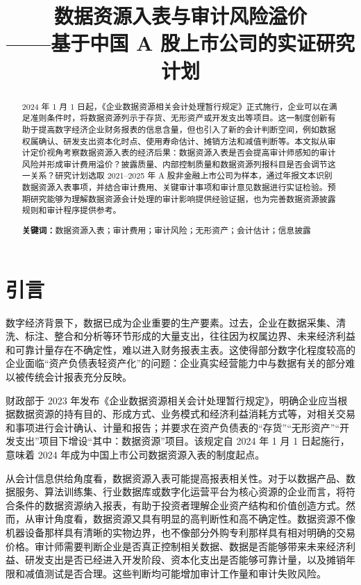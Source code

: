 \documentclass[UTF8,zihao=-4,a4paper]{ctexart}
\title{\bfseries 数据资源入表与审计风险溢价\\
{\large ——基于中国 A 股上市公司的实证研究计划}}
\author{}
\date{}
\begin{document}
\maketitle
\vspace{-2.2em}

\begin{abstract}
2024 年 1 月 1 日起，《企业数据资源相关会计处理暂行规定》正式施行，企业可以在满足准则条件时，将数据资源列示于存货、无形资产或开发支出等项目。这一制度创新有助于提高数字经济企业财务报表的信息含量，但也引入了新的会计判断空间，例如数据权属确认、研发支出资本化时点、使用寿命估计、摊销方法和减值判断等。本文拟从审计定价视角考察数据资源入表的经济后果：数据资源入表是否会提高审计师感知的审计风险并形成审计费用溢价？披露质量、内部控制质量和数据资源列报科目是否会调节这一关系？研究计划选取 2021--2025 年 A 股非金融上市公司为样本，通过年报文本识别数据资源入表事项，并结合审计费用、关键审计事项和审计意见数据进行实证检验。预期研究能够为理解数据资源会计处理的审计影响提供经验证据，也为完善数据资源披露规则和审计程序提供参考。

\textbf{关键词：}数据资源入表；审计费用；审计风险；无形资产；会计估计；信息披露
\end{abstract}

\section{引言}

数字经济背景下，数据已成为企业重要的生产要素。过去，企业在数据采集、清洗、标注、整合和分析等环节形成的大量支出，往往因为权属边界、未来经济利益和可靠计量存在不确定性，难以进入财务报表主表。这使得部分数字化程度较高的企业面临``资产负债表轻资产化''的问题：企业真实经营能力中与数据有关的部分难以被传统会计报表充分反映。

财政部于 2023 年发布《企业数据资源相关会计处理暂行规定》，明确企业应当根据数据资源的持有目的、形成方式、业务模式和经济利益消耗方式等，对相关交易和事项进行会计确认、计量和报告；并要求在资产负债表的``存货''``无形资产''``开发支出''项目下增设``其中：数据资源''项目。该规定自 2024 年 1 月 1 日起施行，意味着 2024 年成为中国上市公司数据资源入表的制度起点。

从会计信息供给角度看，数据资源入表可能提高报表相关性。对于以数据产品、数据服务、算法训练集、行业数据库或数字化运营平台为核心资源的企业而言，将符合条件的数据资源纳入报表，有助于投资者理解企业资产结构和价值创造方式。然而，从审计角度看，数据资源又具有明显的高判断性和高不确定性。数据资源不像机器设备那样具有清晰的实物边界，也不像部分外购专利那样具有相对明确的交易价格。审计师需要判断企业是否真正控制相关数据、数据是否能够带来未来经济利益、研发支出是否已经进入开发阶段、资本化支出是否能够可靠计量，以及摊销年限和减值测试是否合理。这些判断均可能增加审计工作量和审计失败风险。
\end{document}
